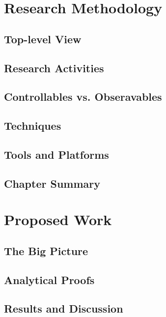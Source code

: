 \documentclass{utmthesis}
\begin{document}
\chapter{Research Methodology}
\section{Top-level View}
\section{Research Activities}
\section{Controllables vs. Obseravables}
\section{Techniques}
\section{Tools and Platforms}
\section{Chapter Summary}

\chapter{Proposed Work}
\section{The Big Picture}
\section{Analytical Proofs}


\section{Results and Discussion}
\end{document}
